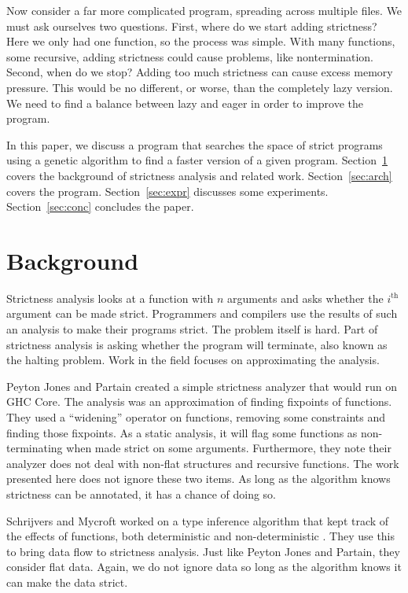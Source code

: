 \documentclass[preprint,nocopyrightspace]{sigplanconf}
\begin{document}
Now consider a far more complicated program, spreading across multiple files. We must ask ourselves two questions. First, where do we start adding strictness? Here we only had one function, so the process was simple. With many functions, some recursive, adding strictness could cause problems, like nontermination. Second, when do we stop? Adding too much strictness can cause excess memory pressure. This would be no different, or worse, than the completely lazy version. We need to find a balance between lazy and eager in order to improve the program.

In this paper, we discuss a program that searches the space of strict programs using a genetic algorithm to find a faster version of a given program. Section~\ref{sec:back} covers the background of strictness analysis and related work. Section~\ref{sec:arch} covers the program. Section~\ref{sec:expr} discusses some experiments. Section~\ref{sec:conc} concludes the paper.

\section{Background}\label{sec:back}
Strictness analysis looks at a function with $n$ arguments and asks whether the $i^{\text{th}}$ argument can be made strict. Programmers and compilers use the results of such an analysis to make their programs strict. The problem itself is hard. Part of strictness analysis is asking whether the program will terminate, also known as the halting problem. Work in the field focuses on approximating the analysis.

Peyton Jones and Partain created a simple strictness analyzer that would run on GHC Core.\cite{pjones} The analysis was an approximation of finding fixpoints of functions. They used a ``widening'' operator on functions, removing some constraints and finding those fixpoints. As a static analysis, it will flag some functions as non-terminating when made strict on some arguments. Furthermore, they note their analyzer does not deal with non-flat structures and recursive functions. The work presented here does not ignore these two items. As long as the algorithm knows strictness can be annotated, it has a chance of doing so.

Schrijvers and Mycroft worked on a type inference algorithm that kept track of the effects of functions, both deterministic and non-deterministic \cite{mycroft, wadler}. They use this to bring data flow to strictness analysis. Just like Peyton Jones and Partain, they consider flat data. Again, we do not ignore data so long as the algorithm knows it can make the data strict.
\end{document}
